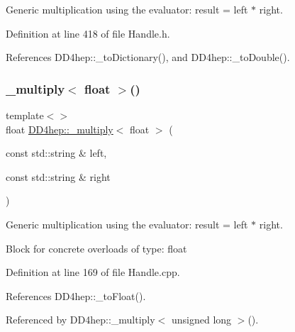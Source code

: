 Generic multiplication using the evaluator\+: result = left $\ast$ right. 



Definition at line 418 of file Handle.\+h.



References D\+D4hep\+::\+\_\+to\+Dictionary(), and D\+D4hep\+::\+\_\+to\+Double().

\hypertarget{group___d_d4_h_e_p___g_e_o_m_e_t_r_y_ga423913783efc6234ea872caa04c39917}{}\label{group___d_d4_h_e_p___g_e_o_m_e_t_r_y_ga423913783efc6234ea872caa04c39917} 
\subsubsection{\texorpdfstring{\+\_\+multiply$<$ float $>$()}{\_multiply< float >()}\hspace{0.1cm}{\footnotesize\ttfamily [1/3]}}
{\footnotesize\ttfamily template$<$$>$ \\
float \hyperlink{group___d_d4_h_e_p___g_e_o_m_e_t_r_y_gab860c2299e2eb50e537c5079fb0c9c51}{D\+D4hep\+::\+\_\+multiply}$<$ float $>$ (\begin{DoxyParamCaption}\item[{const std\+::string \&}]{left,  }\item[{const std\+::string \&}]{right }\end{DoxyParamCaption})}



Generic multiplication using the evaluator\+: result = left $\ast$ right. 

Block for concrete overloads of type\+: float 

Definition at line 169 of file Handle.\+cpp.



References D\+D4hep\+::\+\_\+to\+Float().



Referenced by D\+D4hep\+::\+\_\+multiply$<$ unsigned long $>$().

\hypertarget{group___d_d4_h_e_p___g_e_o_m_e_t_r_y_ga745f4ee0b4b15f86d4992d11c7ca6f15}{}\label{group___d_d4_h_e_p___g_e_o_m_e_t_r_y_ga745f4ee0b4b15f86d4992d11c7ca6f15} 
